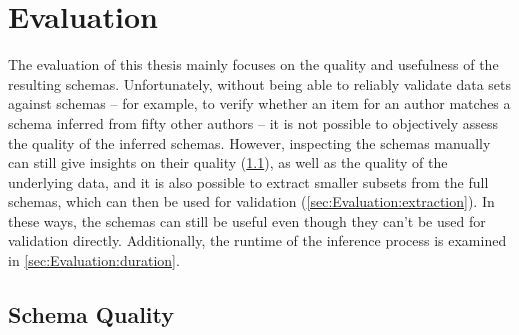 
\chapter{Evaluation}
\label{ch:Evaluation}

The evaluation of this thesis
mainly focuses on the quality and usefulness of the resulting \glspl{schema}.
Unfortunately, without being able to reliably validate data sets against \glspl{schema} –
for example, to verify whether an \gls{item} for an author
matches a \gls{schema} inferred from fifty other authors –
it is not possible to objectively assess the quality of the inferred \glspl{schema}.
However, inspecting the \glspl{schema} manually
can still give insights on their quality (\cref{sec:Evaluation:quality}),
as well as the quality of the underlying data,
and it is also possible to extract smaller subsets from the full \glspl{schema},
which can then be used for validation (\cref{sec:Evaluation:extraction}).
In these ways, the \glspl{schema} can still be useful even though they can’t be used for validation directly.
Additionally, the runtime of the inference process is examined in \cref{sec:Evaluation:duration}.

\section{Schema Quality}
\label{sec:Evaluation:quality}

